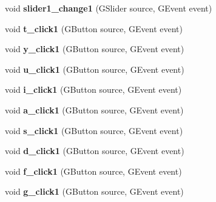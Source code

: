 \begin{DoxyCompactItemize}
\item 
\hypertarget{classkeyplayer__gui_a3455aeebb5d53bcfd236be172961244b}{void {\bfseries slider1\+\_\+change1} (G\+Slider source, G\+Event event)}\label{classkeyplayer__gui_a3455aeebb5d53bcfd236be172961244b}

\item 
\hypertarget{classkeyplayer__gui_aaec3693f64267b2053912dcf4fd32660}{void {\bfseries t\+\_\+click1} (G\+Button source, G\+Event event)}\label{classkeyplayer__gui_aaec3693f64267b2053912dcf4fd32660}

\item 
\hypertarget{classkeyplayer__gui_ae84deb0013362301f9ee8b452b264c48}{void {\bfseries y\+\_\+click1} (G\+Button source, G\+Event event)}\label{classkeyplayer__gui_ae84deb0013362301f9ee8b452b264c48}

\item 
\hypertarget{classkeyplayer__gui_a22be19d2a4aa29c91b1888859856aefc}{void {\bfseries u\+\_\+click1} (G\+Button source, G\+Event event)}\label{classkeyplayer__gui_a22be19d2a4aa29c91b1888859856aefc}

\item 
\hypertarget{classkeyplayer__gui_adbd617bd30824da78b036a048f142592}{void {\bfseries i\+\_\+click1} (G\+Button source, G\+Event event)}\label{classkeyplayer__gui_adbd617bd30824da78b036a048f142592}

\item 
\hypertarget{classkeyplayer__gui_a51ef4d997c462d761de6e64118bd58f9}{void {\bfseries a\+\_\+click1} (G\+Button source, G\+Event event)}\label{classkeyplayer__gui_a51ef4d997c462d761de6e64118bd58f9}

\item 
\hypertarget{classkeyplayer__gui_a6f0a12ae0df822f8323dcf76317554fc}{void {\bfseries s\+\_\+click1} (G\+Button source, G\+Event event)}\label{classkeyplayer__gui_a6f0a12ae0df822f8323dcf76317554fc}

\item 
\hypertarget{classkeyplayer__gui_a1d797e72d4a02988cf263ced815afcae}{void {\bfseries d\+\_\+click1} (G\+Button source, G\+Event event)}\label{classkeyplayer__gui_a1d797e72d4a02988cf263ced815afcae}

\item 
\hypertarget{classkeyplayer__gui_af51bd9f71ebcf79902bd82f7b2faa33f}{void {\bfseries f\+\_\+click1} (G\+Button source, G\+Event event)}\label{classkeyplayer__gui_af51bd9f71ebcf79902bd82f7b2faa33f}

\item 
\hypertarget{classkeyplayer__gui_a501557dc0c653c8dfc9e93050d02573d}{void {\bfseries g\+\_\+click1} (G\+Button source, G\+Event event)}\label{classkeyplayer__gui_a501557dc0c653c8dfc9e93050d02573d}


\end{DoxyCompactItemize}
